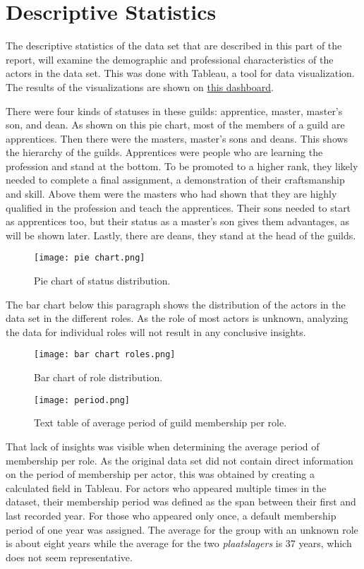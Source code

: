 \documentclass[12pt]{article}
\begin{document}
\section{Descriptive Statistics}
\label{Descriptive Statistics}
The descriptive statistics of the data set that are described in this part of the report, will examine the demographic and professional characteristics of the actors in the data set. This was done with Tableau, a tool for data visualization. The results of the visualizations are shown on \href{https://public.tableau.com/shared/NX25H3TZ9?:display_count=n&:origin=viz_share_link}{this dashboard}. 

There were four kinds of statuses in these guilds: apprentice, master, master's son, and dean. As shown on this pie chart, most of the members of a guild are apprentices. Then there were the masters, master's sons and deans. This shows the hierarchy of the guilds. Apprentices were people who are learning the profession and stand at the bottom. To be promoted to a higher rank, they likely needed to complete a final assignment, a demonstration of their craftsmanship and skill. Above them were the masters who had shown that they are highly qualified in the profession and teach the apprentices. Their sons needed to start as apprentices too, but their status as a master's son gives them advantages, as will be shown later. Lastly, there are deans, they stand at the head of the guilds. 
\begin{figure}[!htbp]
\center
\texttt{[image: pie chart.png]}
\caption{Pie chart of status distribution.}
\label{fig:piechart}
\end{figure}

The bar chart below this paragraph shows the distribution of the actors in the data set in the different roles. As the role of most actors is unknown, analyzing the data for individual roles will not result in any conclusive insights. 
\begin{figure}[!htbp]
\center
\texttt{[image: bar chart roles.png]}
\caption{Bar chart of role distribution.}
\label{fig:barchart}
\end{figure}
\begin {figure}[!htbp]
\center
\texttt{[image: period.png]}
\caption{Text table of average period of guild membership per role.}
\label{fig:texttableperiod}
\end{figure}

That lack of insights was visible when determining the average period of membership per role. As the original data set did not contain direct information on the period of membership per actor, this was obtained by creating a calculated field in Tableau. For actors who appeared multiple times in the dataset, their membership period was defined as the span between their first and last recorded year. For those who appeared only once, a default membership period of one year was assigned. The average for the group with an unknown role is about eight years while the average for the two \textit{plaatslagers} is 37 years, which does not seem representative.
\end{document}
